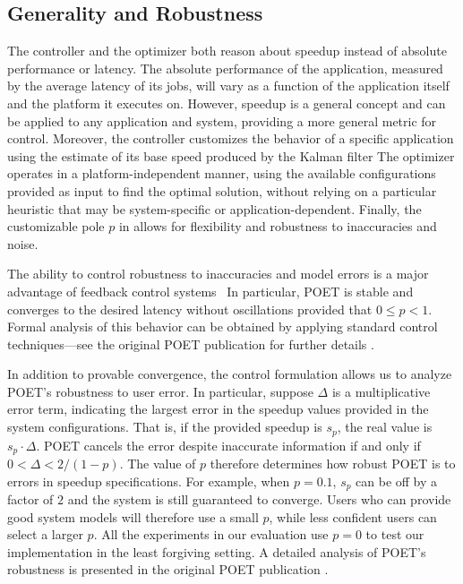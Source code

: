\subsection{Generality and Robustness}

The controller and the optimizer both reason about speedup instead of absolute performance or latency.
The absolute performance of the application, measured by the average latency of its jobs, will vary as a function of the application itself and the platform it executes on.
However, speedup is a general concept and can be applied to any application and system, providing a more general metric for control.
Moreover, the controller customizes the behavior of a specific application using the estimate of its base speed produced by the Kalman filter
The optimizer operates in a platform-independent manner, using the available configurations provided as input to find the optimal solution, without relying on a particular heuristic that may be system-specific or application-dependent.
Finally, the customizable pole $p$ in  allows for flexibility and robustness to inaccuracies and noise.

The ability to control robustness to inaccuracies and model errors is a major advantage of feedback control systems~\cite{ICSE2014}
In particular, POET is stable and converges to the desired latency without oscillations provided that $0 \le p < 1$.
Formal analysis of this behavior can be obtained by applying standard control techniques---see the original POET publication for further details \cite{POET}.

In addition to provable convergence, the control formulation allows us to analyze POET's robustness to user error.
In particular, suppose $\Delta$ is a multiplicative error term, indicating the largest error in the speedup values provided in the system configurations.
That is, if the provided speedup is $s_p$, the real value is $s_p \cdot \Delta$.
POET cancels the error despite inaccurate information if and only if $0 < \Delta < 2/(1-p)$.
The value of $p$ therefore determines how robust POET is to errors in speedup specifications.
For example, when $p = 0.1$, $s_p$ can be off by a factor of $2$ and the system is still guaranteed to converge.
Users who can provide good system models will therefore use a small $p$, while less confident users can select a larger $p$.
All the experiments in our evaluation use $p=0$ to test our implementation in the least forgiving setting.
A detailed analysis of POET's robustness is presented in the original POET publication \cite{POET}.
